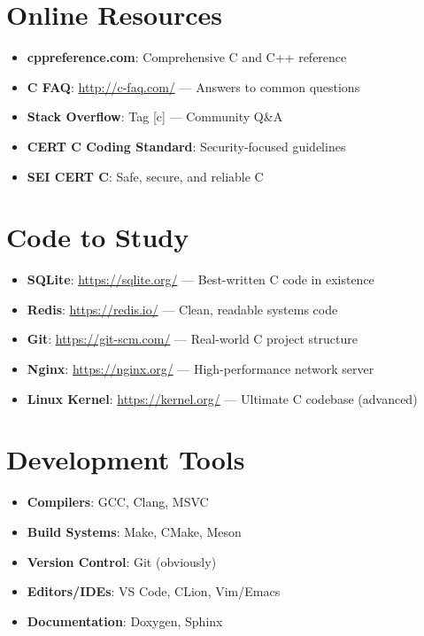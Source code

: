 \documentclass[11pt,openany]{book}
\begin{document}
\section*{Online Resources}

\begin{itemize}
    \item \textbf{cppreference.com}: Comprehensive C and C++ reference
    \item \textbf{C FAQ}: \url{http://c-faq.com/} — Answers to common questions
    \item \textbf{Stack Overflow}: Tag [c] — Community Q\&A
    \item \textbf{CERT C Coding Standard}: Security-focused guidelines
    \item \textbf{SEI CERT C}: Safe, secure, and reliable C
\end{itemize}

\section*{Code to Study}

\begin{itemize}
    \item \textbf{SQLite}: \url{https://sqlite.org/} — Best-written C code in existence
    \item \textbf{Redis}: \url{https://redis.io/} — Clean, readable systems code
    \item \textbf{Git}: \url{https://git-scm.com/} — Real-world C project structure
    \item \textbf{Nginx}: \url{https://nginx.org/} — High-performance network server
    \item \textbf{Linux Kernel}: \url{https://kernel.org/} — Ultimate C codebase (advanced)
\end{itemize}

\section*{Development Tools}

\begin{itemize}
    \item \textbf{Compilers}: GCC, Clang, MSVC
    \item \textbf{Build Systems}: Make, CMake, Meson
    \item \textbf{Version Control}: Git (obviously)
    \item \textbf{Editors/IDEs}: VS Code, CLion, Vim/Emacs
    \item \textbf{Documentation}: Doxygen, Sphinx
\end{itemize}
\end{document}
